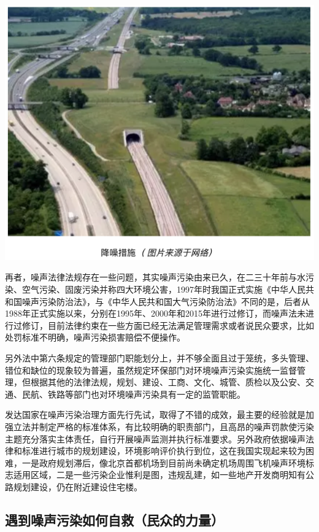 \documentclass[]{book}
\begin{document}
\includegraphics[width=8.33in]{images/zaosheng2}

再者，噪声法律法规存在一些问题，其实噪声污染由来已久，在二三十年前与水污染、空气污染、固废污染并称四大环境公害，1997年时我国正式实施《中华人民共和国噪声污染防治法》，与《中华人民共和国大气污染防治法》不同的是，后者从1988年正式实施以来，分别在1995年、2000年和2015年进行过修订，而噪声法未进行过修订，目前法律约束在一些方面已经无法满足管理需求或者说民众要求，比如处罚标准不明确，噪声污染损害赔偿不便操作。

另外法中第六条规定的管理部门职能划分上，并不够全面且过于笼统，多头管理、错位和缺位的现象较为普遍，虽然规定环保部门对环境噪声污染实施统一监督管理，但根据其他的法律法规，规划、建设、工商、文化、城管、质检以及公安、交通、民航、铁路等部门也对环境噪声污染具有一定的监管职能。

发达国家在噪声污染治理方面先行先试，取得了不错的成效，最主要的经验就是加强立法并制定严格的标准体系，有比较明确的职责部门，且高昂的噪声罚款使污染主题充分落实主体责任，自行开展噪声监测并执行标准要求。另外政府依据噪声法律和标准进行城市的规划建设，环境影响评价执行到位，这在我国实现起来较为困难，一是政府规划滞后，像北京首都机场到目前尚未确定机场周围飞机噪声环境标志适用区域，二是一些污染企业惟利是图，违规乱建，如一些地产开发商明知有公路规划建设，仍在附近建设住宅楼。

\hypertarget{ux9047ux5230ux566aux58f0ux6c61ux67d3ux5982ux4f55ux81eaux6551ux6c11ux4f17ux7684ux529bux91cf}{%
\subsection{遇到噪声污染如何自救（民众的力量）}\label{ux9047ux5230ux566aux58f0ux6c61ux67d3ux5982ux4f55ux81eaux6551ux6c11ux4f17ux7684ux529bux91cf}}
\end{document}
